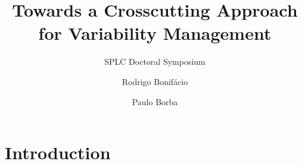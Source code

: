 \documentclass[xcolor=svgnames]{beamer}
\title{Towards a Crosscutting Approach for Variability Management}
\subtitle{SPLC Doctoral Symposium}
\author{Rodrigo Bonif\'{a}cio \and Paulo Borba}
\institute
{
	Informatics Center \\ Federal University of Pernambuco \\ Brazil
}
\begin{document}
\lstset{language=haskell}

\begin{frame}
\titlepage
\end{frame}

\section{Introduction}

% 
% 
% 
% 
% 
\end{document}
